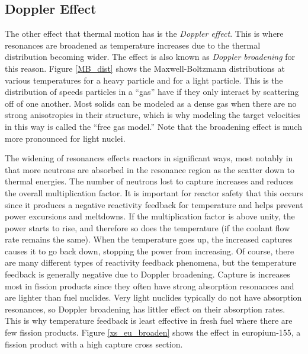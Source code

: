 \subsection{Doppler Effect}


The other effect that thermal motion has is the \emph{Doppler effect}.  This is where resonances are broadened as temperature increases due to the thermal distribution becoming wider.  The effect is also known as \emph{Doppler broadening} for this reason.  Figure \ref{MB_dist} shows the Maxwell-Boltzmann distributions at various temperatures for a heavy particle and for a light particle.  This is the distribution of speeds particles in a ``gas'' have if they only interact by scattering off of one another.  Most solids can be modeled as a dense gas when there are no strong anisotropies in their structure, which is why modeling the target velocities in this way is called the ``free gas model.''  Note that the broadening effect is much more pronounced for light nuclei.  

The widening of resonances effects reactors in significant ways, most notably in that more neutrons are absorbed in the resonance region as the scatter down to thermal energies.  The number of neutrons lost to capture increases and reduces the overall multiplication factor.  It is important for reactor safety that this occurs since it produces a negative reactivity feedback for temperature and helps prevent power excursions and meltdowns.  If the multiplication factor is above unity, the power starts to rise, and therefore so does the temperature (if the coolant flow rate remains the same).  When the temperature goes up, the increased captures causes it to go back down, stopping the power from increasing.  Of course, there are many different types of reactivity feedback phenomena, but the temperature feedback is generally negative due to Doppler broadening.  Capture is increases most in fission products since they often have strong absorption resonances and are lighter than fuel nuclides.  Very light nuclides typically do not have absorption resonances, so Doppler broadening has littler effect on their absorption rates.  This is why temperature feedback is least effective in fresh fuel where there are few fission products.  Figure \ref{xs_eu_broaden} shows the effect in europium-155, a fission product with a high capture cross section.

